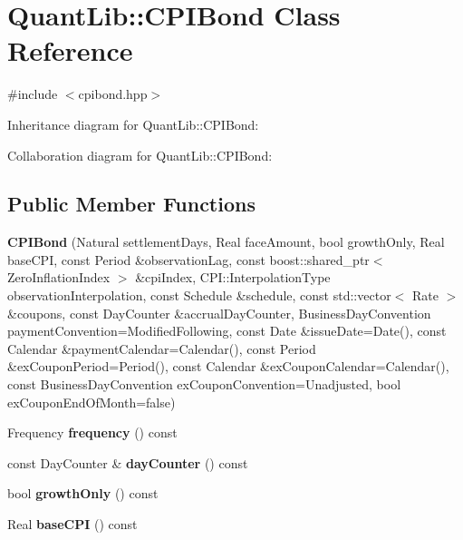 \section{Quant\+Lib\+:\+:C\+P\+I\+Bond Class Reference}
\label{class_quant_lib_1_1_c_p_i_bond}


{\ttfamily \#include $<$cpibond.\+hpp$>$}



Inheritance diagram for Quant\+Lib\+:\+:C\+P\+I\+Bond\+:


Collaboration diagram for Quant\+Lib\+:\+:C\+P\+I\+Bond\+:
\subsection*{Public Member Functions}
\begin{DoxyCompactItemize}
\item 
{\bfseries C\+P\+I\+Bond} (Natural settlement\+Days, Real face\+Amount, bool growth\+Only, Real base\+C\+PI, const Period \&observation\+Lag, const boost\+::shared\+\_\+ptr$<$ Zero\+Inflation\+Index $>$ \&cpi\+Index, C\+P\+I\+::\+Interpolation\+Type observation\+Interpolation, const Schedule \&schedule, const std\+::vector$<$ Rate $>$ \&coupons, const Day\+Counter \&accrual\+Day\+Counter, Business\+Day\+Convention payment\+Convention=Modified\+Following, const Date \&issue\+Date=Date(), const Calendar \&payment\+Calendar=Calendar(), const Period \&ex\+Coupon\+Period=Period(), const Calendar \&ex\+Coupon\+Calendar=Calendar(), const Business\+Day\+Convention ex\+Coupon\+Convention=Unadjusted, bool ex\+Coupon\+End\+Of\+Month=false)\label{class_quant_lib_1_1_c_p_i_bond_a0e6de21ea27210b4a557e756ac5e7c5d}

\item 
Frequency {\bfseries frequency} () const \label{class_quant_lib_1_1_c_p_i_bond_af6eba13edb1c01211d4362638a5407d1}

\item 
const Day\+Counter \& {\bfseries day\+Counter} () const \label{class_quant_lib_1_1_c_p_i_bond_af5c7e6dbd3fba280acdd3524bddb9ac7}

\item 
bool {\bfseries growth\+Only} () const \label{class_quant_lib_1_1_c_p_i_bond_abca00d1324c0cdebcdcf9596cd2dd4a2}

\item 
Real {\bfseries base\+C\+PI} () const \label{class_quant_lib_1_1_c_p_i_bond_a219914d7ec7eaa26a2002f4eeb75e14a}


\end{DoxyCompactItemize}
